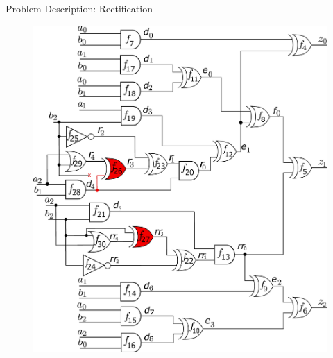 \begin{frame}{\large Problem Description: Rectification}

\begin{figure}[hbt]
\centering
\includegraphics[scale=0.26]{mas_3_ddc_mfr_a.pdf}
\caption*{
}\label{fig:mas_bug_Wa}
\end{figure}
\end{frame}

